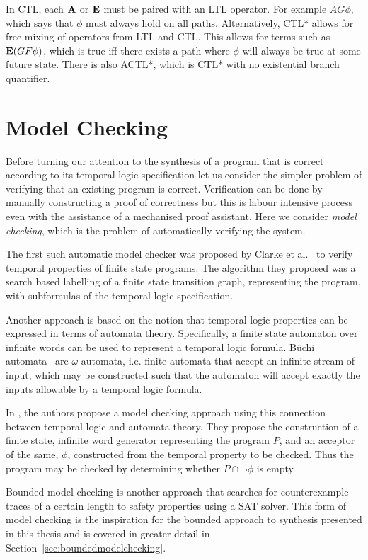 In CTL, each $\textbf{A}$ or $\textbf{E}$ must be paired with an LTL operator. For example
$AG\phi$, which says that $\phi$ must always hold on all paths. Alternatively,
CTL* allows for free mixing of operators from LTL and CTL. This allows for
terms such as $\textbf{E}(GF\phi)$, which is true iff there exists a path where $\phi$
will always be true at some future state. There is also ACTL*, which is CTL* with no existential branch quantifier.

\section{Model Checking}

Before turning our attention to the synthesis of a program that is correct according to its temporal logic specification let us consider the simpler problem of verifying that an existing program is correct. Verification can be done by manually constructing a proof of correctness but this is labour intensive process even with the assistance of a mechanised proof assistant. Here we consider \emph{model checking}, which is the problem of automatically verifying the system.

The first such automatic model checker was proposed by Clarke et al.~\cite{Clarke86} to verify temporal properties of finite state programs. The algorithm they proposed was a search based labelling of a finite state transition graph, representing the program, with subformulas of the temporal logic specification. 

Another approach is based on the notion that temporal logic properties can be
expressed in terms of automata theory. Specifically, a finite state automaton
over infinite words can be used to represent a temporal logic formula. B\"uchi
automata~\cite{Buchi62} are $\omega$-automata, i.e. finite automata that accept
an infinite stream of input, which may be constructed such that the automaton
will accept exactly the inputs allowable by a temporal logic formula.

In \cite{Vardi96}, the authors propose a model checking approach using this
connection between temporal logic and automata theory. They propose the
construction of a finite state, infinite word generator representing the
program $P$, and an acceptor of the same, $\phi$, constructed from the temporal
property to be checked. Thus the program may be checked by determining whether $P \cap \lnot \phi$ is empty.

Bounded model checking is another approach that searches for counterexample traces of a certain length to safety properties using a SAT solver.  This form of model checking is the inspiration for the bounded approach to synthesis presented in this thesis and is covered in greater detail in Section~\ref{sec:boundedmodelchecking}.

